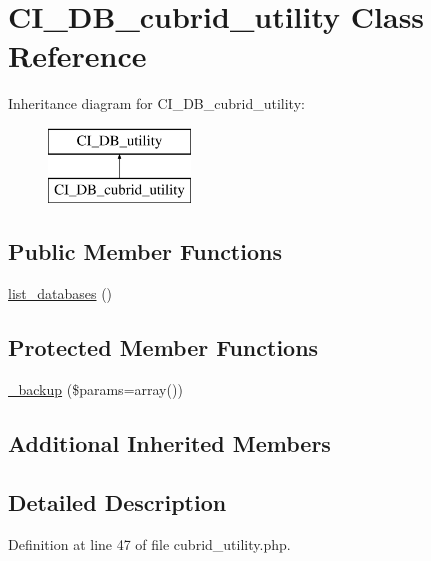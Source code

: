 \hypertarget{class_c_i___d_b__cubrid__utility}{}\section{C\+I\+\_\+\+D\+B\+\_\+cubrid\+\_\+utility Class Reference}
\label{class_c_i___d_b__cubrid__utility}
Inheritance diagram for C\+I\+\_\+\+D\+B\+\_\+cubrid\+\_\+utility\+:\begin{figure}[H]
\begin{center}
\leavevmode
\includegraphics[height=2.000000cm]{class_c_i___d_b__cubrid__utility}
\end{center}
\end{figure}
\subsection*{Public Member Functions}
\begin{DoxyCompactItemize}
\item 
\mbox{\hyperlink{class_c_i___d_b__cubrid__utility_a8486b247a8868504b055622cb2dd34d3}{list\+\_\+databases}} ()
\end{DoxyCompactItemize}
\subsection*{Protected Member Functions}
\begin{DoxyCompactItemize}
\item 
\mbox{\hyperlink{class_c_i___d_b__cubrid__utility_a30f3053d2c82e7562349924363507afa}{\+\_\+backup}} (\$params=array())
\end{DoxyCompactItemize}
\subsection*{Additional Inherited Members}


\subsection{Detailed Description}


Definition at line 47 of file cubrid\+\_\+utility.\+php.



